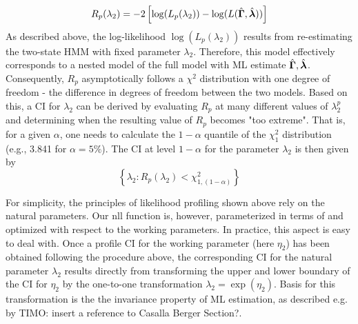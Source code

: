 \documentclass[bimj,fleqn]{w-art}\usepackage[]{graphicx}\usepackage[]{color}
\newcommand{\bgamma}{\mbox{\boldmath $\Gamma$}}
\newcommand{\bflambda}{\mbox{\boldmath $\lambda$}}
\theoremstyle{plain}
\theoremstyle{definition}
\begin{document}
\begin{equation}
R_p(\lambda_2) = -2 \left[ \log(L_p(\lambda_2)) - \log(L(\hat{\bgamma}, \hat{\bflambda}))\right]
\label{eq:profileLR}
\end{equation}
As described above, the log-likelihood $\log(L_p(\lambda_2))$ results from re-estimating the two-state HMM with fixed parameter $\lambda_2$. Therefore, this model effectively corresponds to a nested model of the full model with ML estimate $\hat{\bgamma}, \hat{\bflambda}$. Consequently, $R_p$ asymptotically follows a $\chi^{2}$ distribution with one degree of freedom - the difference in degrees of freedom between the two models. Based on this, a CI for $\lambda_2$ can be derived by evaluating $R_p$ at many different values of $\lambda_2^p$ and determining when the resulting value of $R_p$ becomes "too extreme". That is, for a given $\alpha$, one needs to calculate the $1-\alpha$ quantile of the $\chi^{2}_{1}$ distribution (e.g., 3.841 for $\alpha = 5\%$). The CI at level $1-\alpha$ for the parameter $\lambda_2$ is then given by 
\begin{equation}
\left\{\lambda_2: R_p(\lambda_2)  < \chi^{2}_{1, (1-\alpha)}\right\}
\label{eq:profileCI}
\end{equation}

\bigskip

% 
% 

For simplicity, the principles of likelihood profiling shown above rely on the natural parameters. Our nll function is, however, parameterized in terms of and optimized with respect to the working parameters. In practice, this aspect is easy to deal with. Once a profile CI for the working parameter (here $\eta_2$) has been obtained following the procedure above, the corresponding CI for the natural parameter $\lambda_2$ results directly from transforming the upper and lower boundary of the CI for $\eta_2$ by the one-to-one transformation $\lambda_2 = \exp(\eta_2)$. Basis for this transformation is the the invariance property of ML estimation, as described e.g. by \citet[Theorem 7.2.10 on p. ~320]{casella}TIMO: insert a reference to Casalla Berger Section?.   
\end{document}
